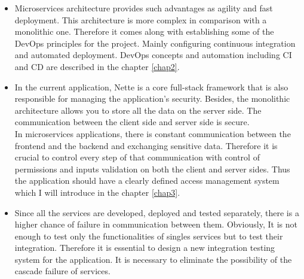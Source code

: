 \begin{itemize}
    \item Microservices architecture provides such advantages as agility and fast deployment. This architecture is more complex in comparison with a monolithic one. Therefore it comes along with establishing some of the DevOps principles for the project. Mainly configuring continuous integration and automated deployment. DevOps concepts and automation including CI and CD are described in the chapter \ref{chap2}.
    \item In the current application, Nette is a core full-stack framework that is also responsible for managing the application's security. Besides, the monolithic architecture allows you to store all the data on the server side. The communication between the client side and server side is secure.\\
    In microservices applications, there is constant communication between the frontend and the backend and exchanging sensitive data. Therefore it is crucial to control every step of that communication with control of permissions and inputs validation on both the client and server sides. Thus the application should have a clearly defined access management system which I will introduce in the chapter \ref{chap3}.
    \item Since all the services are developed, deployed and tested separately, there is a higher chance of failure in communication between them. Obviously, It is not enough to test only the functionalities of singles services but to test their integration. Therefore it is essential to design a new integration testing system for the application. It is necessary to eliminate the possibility of the cascade failure of services.
\end{itemize}
